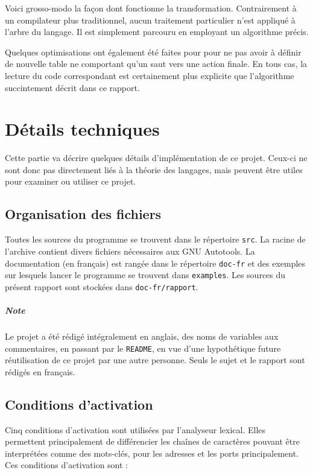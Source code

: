 \documentclass[a4paper,11pt]{report}
\begin{document}
\bigskip
Voici grosso-modo la façon dont fonctionne la transformation. Contrairement à
un compilateur plus traditionnel, aucun traitement particulier n'est appliqué
à l'arbre du langage. Il est simplement parcouru en employant un algorithme
précis.

Quelques optimisations ont également été faites pour pour ne pas avoir à
définir de nouvelle table ne comportant qu'un saut vers une action finale. En
tous cas, la lecture du code correspondant est certainement plus explicite que
l'algorithme succintement décrit dans ce rapport.

\chapter{Détails techniques}

\begin{intro}
  Cette partie va décrire quelques détails d'implémentation de ce projet.
  Ceux-ci ne sont donc pas directement liés à la théorie des langages, mais
  peuvent être utiles pour examiner ou utiliser ce projet.
\end{intro}

\section{Organisation des fichiers}

Toutes les sources du programme se trouvent dans le répertoire \verb!src!. La
racine de l'archive contient divers fichiers nécessaires aux GNU Autotools. La
documentation (en français) est rangée dans le répertoire \verb!doc-fr! et des
exemples sur lesquels lancer le programme se trouvent dans \verb!examples!.
Les sources du présent rapport sont stockées dans \verb!doc-fr/rapport!.

\paragraph{Note} Le projet a été rédigé intégralement en anglais, des noms de
variables aux commentaires, en passant par le \verb!README!, en vue d'une
hypothétique future réutilisation de ce projet par une autre personne. Seuls
le sujet et le rapport sont rédigés en français.

\section{Conditions d'activation}

Cinq conditions d'activation sont utilisées par l'analyseur lexical. Elles
permettent principalement de différencier les chaînes de caractères pouvant
être interprétées comme des mots-clés, pour les adresses et les ports
principalement. Ces conditions d'activation sont :
\end{document}
